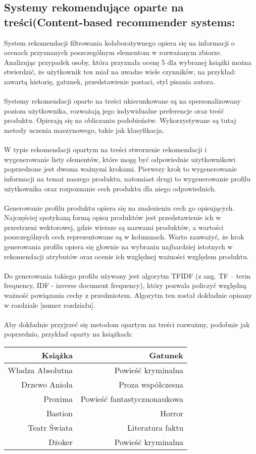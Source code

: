 \documentclass[12pt,a4paper]{report}
\begin{document}
\subsection{Systemy rekomendujące oparte na treści(Content-based recommender systems:}
System rekomendacji filtrowania kolaboratywnego opiera się na informacji o ocenach przyznanych poszczególnym elementom w rozważanym zbiorze. Analizując przypadek osoby, która przyznała ocenę 5 dla wybranej książki można stwierdzić, że użytkownik ten miał na uwadze wiele czynników, na przykład: zawartą historię, gatunek, przedstawienie postaci, styl pisania autora. 
\\
\\Systemy rekomendacji oparte na treści ukierunkowane są na spersonalizowany poziom użytkownika, rozważają jego indywidualne preferencje oraz treść produktu. Opierają się na obliczaniu podobieństw. Wykorzystywane są tutaj metody uczenia maszynowego, takie jak klasyfikacja.
\\
\\W typie rekomendacji opartym na treści stworzenie rekomendacji i wygenerowanie listy elementów, które mogę być odpowiednie użytkownikowi poprzedzone jest dwoma ważnymi krokami. Pierwszy krok to wygenerowanie informacji na temat naszego produktu, natomiast drugi to wygenerowanie profilu użytkownika oraz  rozpoznanie cech produktu dla niego odpowiednich.  
\\ 
\\Generowanie profilu produktu opiera się na znalezieniu cech go opisujących. Najczęściej spotykaną formą opisu produktów jest przedstawienie ich w przestrzeni wektorowej, gdzie wiersze są nazwami produktów, a wartości poszczególnych cech reprezentowane są w kolumnach. Warto zauważyć, że krok generowania profilu opiera się głownie na wybraniu najbardziej istotnych w rekomendacji atrybutów oraz ocenie ich względnej ważności względem produktu.
\\
\\Do generowania takiego profilu używany jest algorytm  TFIDF (z ang. TF – term frequency, IDF - inverse document frequency), który pozwala policzyć względną ważność powiązania cechy z przedmiotem. Algorytm ten został dokładnie opisany w rozdziale [numer rozdziału]. 
\\
\\Aby dokładnie przyjrzeć się metodom opartym na treści rozważmy, podobnie jak poprzednio, przykład oparty na książkach:
\begin{center}
\begin{tabular}{|r|r|} \hline
Książka & Gatunek \\
\hline \hline 
Władza Absolutna & Powieść kryminalna  \\
Drzewo Anioła & Proza współczesna \\
Proxima & Powieść fantastycznonaukowa \\
Bastion & Horror\\
Teatr Świata & Literatura faktu \\
Dżoker & Powieść kryminalna \\
\hline
\end{tabular}
\end{center}
\end{document}

